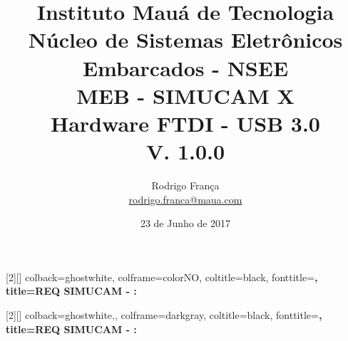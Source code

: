 [2][]{%
				colback=ghostwhite,
				colframe=colorNO,
				coltitle=black,
				fonttitle=\bfseries,
				title=REQ SIMUCAM - \thetcbcounter: }
			
[2][]{%
				colback=ghostwhite,,
				colframe=darkgray,
				coltitle=black,				
				fonttitle=\bfseries,
				title=REQ SIMUCAM - \thetcbcounter: }
		

\newcommand{\RF}{Rodrigo França}

\newcommand{\LastUpdateVersion}{1.0.0}
\newcommand{\LastUpdateDate}{23/06/2017}
\newcommand{\LastUpdateDateLong}{23 de Junho de 2017}

\newcommand{\addrevisiontable}{
  \begin{center}
  	\begin {tabularx}{\textwidth}{l l l X}
  	\textbf{Revisão} & \textbf{Data} & \textbf{Autor(es)} & \textbf{Descrição}\\ \hline
  	\LastUpdateVersion & 
  	\shortdate \LastUpdateDate & 
  	\RF & 
  	Criação do documento. \\
  	\end {tabularx}
  \end{center}
}


\title		{   \LARGE
				Instituto Mauá de Tecnologia \\
				Núcleo de Sistemas Eletrônicos Embarcados - NSEE \\ 
				\huge 
				\vspace{12px}
				MEB - SIMUCAM X \\
				Hardware FTDI - USB 3.0 \\
				V. \LastUpdateVersion
			}
\author		{
			 Rodrigo França \\ \small 	
			 \href{mailto:rodrigo.franca@maua.com}{rodrigo.franca@maua.com}
			}
\date       {\LastUpdateDateLong}

